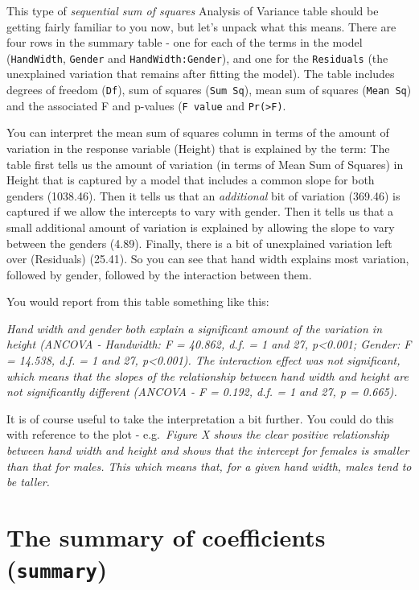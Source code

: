 \documentclass[
  a4paperpaper,
]{book}
\begin{document}
This type of \emph{sequential sum of squares} Analysis of Variance table should be getting fairly familiar to you now, but let's unpack what this means. There are four rows in the summary table - one for each of the terms in the model (\texttt{HandWidth}, \texttt{Gender} and \texttt{HandWidth:Gender}), and one for the \texttt{Residuals} (the unexplained variation that remains after fitting the model). The table includes degrees of freedom (\texttt{Df}), sum of squares (\texttt{Sum\ Sq}), mean sum of squares (\texttt{Mean\ Sq}) and the associated F and p-values (\texttt{F\ value} and \texttt{Pr(\textgreater{}F)}.

You can interpret the mean sum of squares column in terms of the amount of variation in the response variable (Height) that is explained by the term: The table first tells us the amount of variation (in terms of Mean Sum of Squares) in Height that is captured by a model that includes a common slope for both genders (1038.46). Then it tells us that an \emph{additional} bit of variation (369.46) is captured if we allow the intercepts to vary with gender. Then it tells us that a small additional amount of variation is explained by allowing the slope to vary between the genders (4.89). Finally, there is a bit of unexplained variation left over (Residuals) (25.41). So you can see that hand width explains most variation, followed by gender, followed by the interaction between them.

You would report from this table something like this:

\emph{Hand width and gender both explain a significant amount of the variation in height (ANCOVA - Handwidth: F = 40.862, d.f. = 1 and 27, p\textless0.001; Gender: F = 14.538, d.f. = 1 and 27, p\textless0.001). The interaction effect was not significant, which means that the slopes of the relationship between hand width and height are not significantly different (ANCOVA - F = 0.192, d.f. = 1 and 27, p = 0.665).}

It is of course useful to take the interpretation a bit further. You could do this with reference to the plot - e.g.~\emph{Figure X shows the clear positive relationship between hand width and height and shows that the intercept for females is smaller than that for males. This which means that, for a given hand width, males tend to be taller.}

\hypertarget{the-summary-of-coefficients-summary}{%
\section{\texorpdfstring{The summary of coefficients (\texttt{summary})}{The summary of coefficients (summary)}}\label{the-summary-of-coefficients-summary}}
\end{document}
